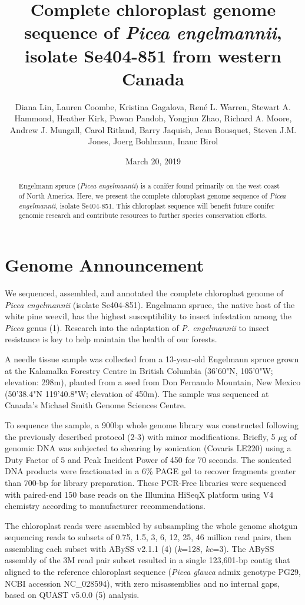 \documentclass[titlepage,11pt, oneside]{article}   	%
\title{\textbf{Complete chloroplast genome sequence of \textit{Picea engelmannii}, isolate Se404-851 from western Canada\newline}}
\author{Diana Lin, Lauren Coombe, Kristina Gagalova, Ren\'{e} L. Warren, Stewart A. Hammond, Heather Kirk, Pawan Pandoh, Yongjun Zhao, Richard A. Moore, Andrew J. Mungall, Carol Ritland, Barry Jaquish, Jean Bousquet, Steven J.M. Jones, Joerg Bohlmann, Inanc Birol\newline}
\date{March 20, 2019}
\makeatletter
\renewcommand{\maketitle}{\bgroup\setlength{\parindent}{0pt}
\begin{flushleft}
  \textbf{\@title}

  \@author
\end{flushleft}\egroup
}
\makeatother
\begin{document}
\maketitle
\begin{abstract}


Engelmann spruce (\textit{Picea engelmannii}) is a conifer found primarily on the west coast of North America. Here, we present the complete chloroplast genome sequence of \textit{Picea engelmannii}, isolate Se404-851. This chloroplast sequence will benefit future conifer genomic research and contribute resources to further species conservation efforts.
\end{abstract}

\section*{Genome Announcement}
We sequenced, assembled, and annotated the complete chloroplast genome of \textit{Picea engelmannii} (isolate Se404-851). Engelmann spruce, the native host of the white pine weevil, has the highest susceptibility to insect infestation among the \textit{Picea} genus (1). Research into the adaptation of \textit{P. engelmannii} to insect resistance is key to help maintain the health of our forests.
\newline
\par
A needle tissue sample was collected from a 13-year-old Engelmann spruce grown at the Kalamalka Forestry Centre in British Columbia (36'60"N, 105'0"W; elevation: 298m), planted from a seed from Don Fernando Mountain, New Mexico (50'38.4"N 119'40.8"W; elevation of 450m). The sample was sequenced at Canada’s Michael Smith Genome Sciences Centre.
\newline
\par
To sequence the sample, a 900bp whole genome library was constructed following the previously described protocol (2-3) with minor modifications. Briefly, 5 $\mu$g of genomic DNA was subjected to shearing by sonication (Covaris LE220) using a Duty Factor of 5 and Peak Incident Power of 450 for 70 seconds. The sonicated DNA products were fractionated in a 6\% PAGE gel to recover fragments greater than 700-bp for library preparation. These PCR-Free libraries were sequenced with paired-end 150 base reads on the Illumina HiSeqX platform using V4 chemistry according to manufacturer recommendations.
\newline
\par
The chloroplast reads were assembled by subsampling the whole genome shotgun sequencing reads to subsets of 0.75, 1.5, 3, 6, 12, 25, 46 million read pairs, then assembling each subset with ABySS v2.1.1 (4) (\textit{k}=128, \textit{kc}=3). The ABySS assembly of the 3M read pair subset resulted in a single 123,601-bp contig that aligned to the reference chloroplast sequence (\textit{Picea glauca} admix genotype PG29, NCBI accession NC\_028594), with zero misassemblies and no internal gaps, based on QUAST v5.0.0 (5) analysis.
\end{document}
